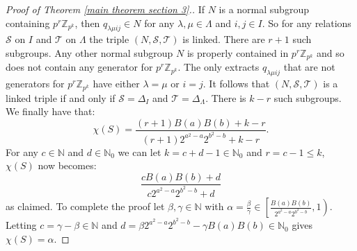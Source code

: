 \documentclass[10pt,a4paper]{amsart}
\newcommand{\N}{\mathbb{N}}
\newcommand{\Z}{\mathbb{Z}}
\begin{document}
\begin{proof}[Proof of Theorem \ref{main theorem section 3}.]
    If $N$ is a normal subgroup containing $p^r \Z_{p^k}$, then $q_{\lambda \mu i j} \in N$ for any $\lambda,\mu \in \Lambda$ and $i,j \in I$.
    So for any relations $\mathcal{S}$ on $I$ and $\mathcal{T}$ on $\Lambda$ the triple $(N,\mathcal{S},\mathcal{T})$ is linked.
    There are $r+1$ such subgroups.
    Any other normal subgroup $N$ is properly contained in $p^r \Z_{p^k}$ and so does not contain any generator for $p^r\Z_{p^k}$.
    The only extracts $q_{\lambda \mu i j}$ that are not generators for $p^r \Z_{p^k}$ have either $\lambda = \mu$ or $i =j$.
    It follows that $(N,\mathcal{S}, \mathcal{T})$ is a linked triple if and only if $\mathcal{S} = \Delta_I$ and $\mathcal{T} = \Delta_\Lambda$.
    There is $k-r$ such subgroups.
    We finally have that:
    \begin{equation}
        \label{rees matrix construction}
        \chi(S) = \frac{(r+1) B(a)B(b) + k-r}{(r+1)2^{a^2 - a} 2^{b^2 - b} + k - r}.
    \end{equation}
    For any $c \in \N$ and $d \in \N_0$ we can let $k = c+d - 1 \in \N_0$ and $r = c - 1 \leq k$, $\chi(S)$ now becomes:
    \begin{equation*}
        \frac{cB(a)B(b)+ d}{c 2^{a^2 - a} 2^{b^2 - b} + d}
    \end{equation*}
    as claimed.
    To complete the proof let $\beta ,\gamma \in \N$ with $\alpha = \frac{\beta}{\gamma}\in \left[ \frac{B(a)B(b)}{2^{a^2 - a}2^{b^2 - b}} , 1\right) $.
    Letting $c = \gamma - \beta \in \N$ and $d = \beta 2^{a^2 - a} 2^{b^2 - b} - \gamma B(a) B(b) \in \N_0$
    gives $\chi(S) = \alpha$.
\end{proof}
\end{document}
